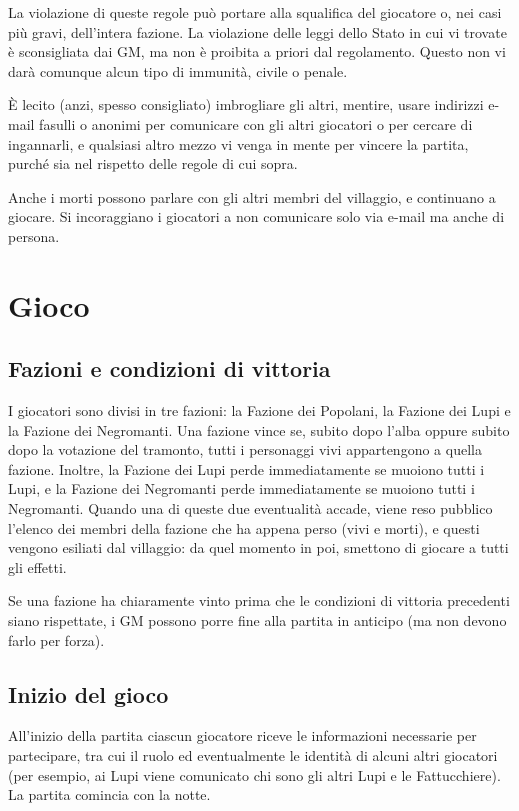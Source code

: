 \documentclass[a4paper,10pt]{article}
\begin{document}
La violazione di queste regole può portare alla squalifica
del giocatore o, nei casi più gravi, dell'intera fazione.
La violazione delle leggi dello Stato in cui vi trovate è sconsigliata dai GM,
ma non è proibita a priori dal regolamento. Questo non vi darà comunque alcun tipo di
immunità, civile o penale.

È lecito (anzi, spesso consigliato) imbrogliare gli altri, mentire, usare
indirizzi e-mail fasulli o anonimi per comunicare con gli altri giocatori o per
cercare di ingannarli, e qualsiasi altro mezzo vi venga in mente per vincere la
partita, purché sia nel rispetto delle regole di cui sopra.

Anche i morti possono parlare con gli altri membri del villaggio, e continuano a
giocare. Si incoraggiano i giocatori a non comunicare solo via e-mail ma anche
di persona.


\pagebreak
\section{Gioco}

\subsection{Fazioni e condizioni di vittoria}

I giocatori sono divisi in tre fazioni: la Fazione dei Popolani, la Fazione dei
Lupi e la Fazione dei Negromanti.
Una fazione vince se, subito dopo l'alba oppure subito dopo la votazione del
tramonto, tutti i personaggi vivi appartengono a quella fazione.
Inoltre, la Fazione dei Lupi perde immediatamente se muoiono tutti i Lupi, e la
Fazione dei Negromanti perde immediatamente se muoiono tutti i Negromanti.
Quando una di queste due eventualità accade, viene reso pubblico l'elenco dei
membri della fazione che ha appena perso (vivi e morti), e questi vengono
esiliati dal villaggio: da quel momento in poi, smettono di giocare a tutti gli
effetti.

Se una fazione ha chiaramente vinto prima che le condizioni di vittoria
precedenti siano rispettate, i GM possono porre fine alla partita in anticipo
(ma non devono farlo per forza).

\subsection{Inizio del gioco}

All'inizio della partita ciascun giocatore riceve le informazioni necessarie per partecipare,
tra cui il ruolo ed eventualmente le identità di alcuni altri giocatori (per esempio, ai Lupi viene
comunicato chi sono gli altri Lupi e le Fattucchiere).
La partita comincia con la notte.
\end{document}
